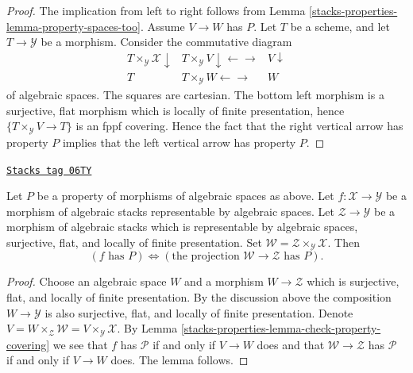 \begin{proof}
The implication from left to right follows from
Lemma \ref{stacks-properties-lemma-property-spaces-too}.
Assume $V \to W$ has $P$. Let $T$ be a scheme, and let
$T \to \mathcal{Y}$ be a morphism. Consider the commutative diagram
$$
\begin{array}{ccc}T \times_\mathcal{Y} \mathcal{X} \downarrow & T \times_\mathcal{Y} V \downarrow\longleftarrow\longrightarrow & V \downarrow \\ T & T \times_\mathcal{Y} W \longleftarrow\longrightarrow & W\end{array}
$$
of algebraic spaces. The squares are cartesian.
The bottom left morphism is a surjective, flat morphism which is locally of
finite presentation, hence $\{T \times_\mathcal{Y} V \to T\}$ is an
fppf covering. Hence the fact that the right vertical arrow has property
$P$ implies that the left vertical arrow has property $P$.
\end{proof}

\begin{lemma}
\label{stacks-properties-lemma-check-property-weak-covering}
\href{https://stacks.math.columbia.edu/tag/06TY}{\texttt{Stacks tag 06TY}}

Let $P$ be a property of morphisms of algebraic spaces as above.
Let $f : \mathcal{X} \to \mathcal{Y}$ be a morphism of algebraic stacks
representable by algebraic spaces.
Let $\mathcal{Z} \to \mathcal{Y}$ be a morphism of algebraic stacks which
is representable by algebraic spaces, surjective, flat, and
locally of finite presentation.
Set $\mathcal{W} = \mathcal{Z} \times_\mathcal{Y} \mathcal{X}$. Then
$$
(f\text{ has }P) \Leftrightarrow
(\text{the projection }\mathcal{W} \to \mathcal{Z}\text{ has }P).
$$
\end{lemma}

\begin{proof}
Choose an algebraic space $W$ and a morphism
$W \to \mathcal{Z}$ which is surjective, flat, and locally of finite
presentation. By the discussion above the composition
$W \to \mathcal{Y}$ is also surjective, flat, and locally of finite
presentation. Denote
$V = W \times_\mathcal{Z} \mathcal{W} = V \times_\mathcal{Y} \mathcal{X}$.
By
Lemma \ref{stacks-properties-lemma-check-property-covering}
we see that $f$ has $\mathcal{P}$ if and only if $V \to W$ does
and that $\mathcal{W} \to \mathcal{Z}$ has $\mathcal{P}$ if and only
if $V \to W$ does. The lemma follows.
\end{proof}

